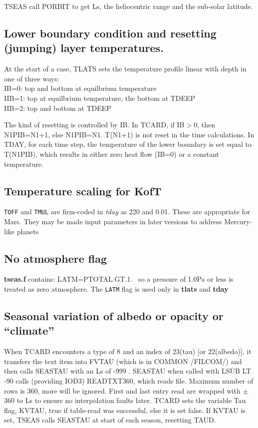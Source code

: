 \documentclass[draft]{article}  %
\newcommand{\qi}{\\ \hspace*{2.em}}      %
\newcommand{\np}{\textbf}  %
\newcommand{\nf}{\textit}  %
\newcommand{\nv}{\texttt}  %
\begin{document}
TSEAS call PORBIT to get Ls, the heliocentric range and the sub-solar latitude.

\subsection{Lower boundary condition and resetting (jumping) layer temperatures.} %
At the start of a case, TLATS sets the temperature profile linear with depth
in one of three ways:
\qi IB=0: top and bottom at equilbrium temperature
\qi IIB=1: top at equilbrium temperature, the bottom at TDEEP
\qi IIB=2: top and bottom at TDEEP

The kind of resetting is controlled by IB. In TCARD, if IB$>$0, then N1PIB=N1+1,
else N1PIB=N1.  T(N1+1) is not reset in the time calculations. In TDAY, for each
time step, the temperature of the lower boundary is set equal to T(N1PIB), which
results in either zero heat flow (IB=0) or a constant temperature.

\subsection{Temperature scaling for KofT} 
\nv{TOFF} and \nv{TMUL} are firm-coded in \nf{tday} as 220 and 0.01. These are appropriate for Mars.
They may be made input parameters in later versions to address Mercury-like planets

\subsection{No atmosphere flag}
\np{tseas.f} contains: LATM=PTOTAL.GT.1. \ so a pressure of 1.0Pa or less is
treated as zero atmosphere. The \nv{LATM} flag is used only in \np{tlats} and
\np{tday}


\subsection{Seasonal variation of albedo or opacity or ``climate''}%

When TCARD encounters a type of 8 and an index of 23(tau) [or 22(albedo)], it
transfers the text item into FVTAU (which is in COMMON /FILCOM/) and then calls
SEASTAU with an Ls of -999 .  SEASTAU when called with LSUB LT -90 calls
(providing IOD3) READTXT360, which reads file. Maximum number of rows is 360,
more will be ignored. First and last entry read are wrapped with $\pm$360 to Ls
to ensure no interpolation faults later. TCARD sets the variable Tau flag, KVTAU,
true if table-read was successful, else it is set false.
If KVTAU is set, TSEAS calls SEASTAU at start of each season, resetting TAUD. 
\end{document}
